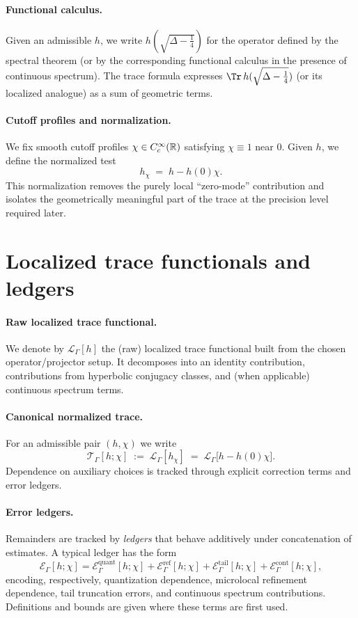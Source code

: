\paragraph{Functional calculus.}
Given an admissible $h$, we write $h(\sqrt{\Delta-\tfrac14})$ for the operator defined by the spectral theorem (or by the corresponding functional calculus in the presence of continuous spectrum).
The trace formula expresses $\Tr\,h(\sqrt{\Delta-\tfrac14})$ (or its localized analogue) as a sum of geometric terms.

\paragraph{Cutoff profiles and normalization.}
We fix smooth cutoff profiles $\chi\in C_c^\infty(\mathbb{R})$ satisfying $\chi\equiv 1$ near $0$.
Given $h$, we define the normalized test
\[
h_\chi \;=\; h - h(0)\chi.
\]
This normalization removes the purely local ``zero-mode'' contribution and isolates the geometrically meaningful part of the trace at the precision level required later.

\section*{Localized trace functionals and ledgers}

\paragraph{Raw localized trace functional.}
We denote by $\mathcal{L}_\Gamma[h]$ the (raw) localized trace functional built from the chosen operator/projector setup.
It decomposes into an identity contribution, contributions from hyperbolic conjugacy classes, and (when applicable) continuous spectrum terms.

\paragraph{Canonical normalized trace.}
For an admissible pair $(h,\chi)$ we write
\[
\mathcal{T}_\Gamma[h;\chi]
\;:=\;\mathcal{L}_\Gamma[h_\chi]
\;=\;\mathcal{L}_\Gamma\bigl[h-h(0)\chi\bigr].
\]
Dependence on auxiliary choices is tracked through explicit correction terms and error ledgers.

\paragraph{Error ledgers.}
Remainders are tracked by \emph{ledgers} that behave additively under concatenation of estimates.
A typical ledger has the form
\[
\mathcal{E}_\Gamma[h;\chi]
=\mathcal{E}^{\mathrm{quant}}_\Gamma[h;\chi]
+\mathcal{E}^{\mathrm{ref}}_\Gamma[h;\chi]
+\mathcal{E}^{\mathrm{tail}}_\Gamma[h;\chi]
+\mathcal{E}^{\mathrm{cont}}_\Gamma[h;\chi],
\]
encoding, respectively, quantization dependence, microlocal refinement dependence, tail truncation errors, and continuous spectrum contributions.
Definitions and bounds are given where these terms are first used.

